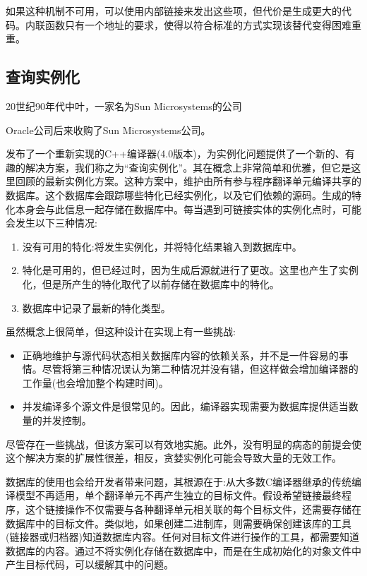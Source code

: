 如果这种机制不可用，可以使用内部链接来发出这些项，但代价是生成更大的代码。内联函数只有一个地址的要求，使得以符合标准的方式实现该替代变得困难重重。

\subsection{查询实例化}

20世纪90年代中叶，一家名为Sun Microsystems的公司

\begin{notice}Oracle公司后来收购了Sun Microsystems公司。
\end{notice}

发布了一个重新实现的C++编译器(4.0版本)，为实例化问题提供了一个新的、有趣的解决方案，我们称之为“查询实例化”。其在概念上非常简单和优雅，但它是这里回顾的最新实例化方案。这种方案中，维护由所有参与程序翻译单元编译共享的数据库。这个数据库会跟踪哪些特化已经实例化，以及它们依赖的源码。生成的特化本身会与此信息一起存储在数据库中。每当遇到可链接实体的实例化点时，可能会发生以下三种情况:

\begin{enumerate}
\item 
没有可用的特化:将发生实例化，并将特化结果输入到数据库中。

\item 
特化是可用的，但已经过时，因为生成后源就进行了更改。这里也产生了实例化，但是所产生的特化取代了以前存储在数据库中的特化。

\item 
数据库中记录了最新的特化类型。
\end{enumerate}

虽然概念上很简单，但这种设计在实现上有一些挑战:

\begin{itemize}
\item 
正确地维护与源代码状态相关数据库内容的依赖关系，并不是一件容易的事情。尽管将第三种情况误认为第二种情况并没有错，但这样做会增加编译器的工作量(也会增加整个构建时间)。

\item 
并发编译多个源文件是很常见的。因此，编译器实现需要为数据库提供适当数量的并发控制。
\end{itemize}

尽管存在一些挑战，但该方案可以有效地实施。此外，没有明显的病态的前提会使这个解决方案的扩展性很差，相反，贪婪实例化可能会导致大量的无效工作。

数据库的使用也会给开发者带来问题，其根源在于:从大多数C编译器继承的传统编译模型不再适用，单个翻译单元不再产生独立的目标文件。假设希望链接最终程序，这个链接操作不仅需要与各种翻译单元相关联的每个目标文件，还需要存储在数据库中的目标文件。类似地，如果创建二进制库，则需要确保创建该库的工具(链接器或归档器)知道数据库内容。任何对目标文件进行操作的工具，都需要知道数据库的内容。通过不将实例化存储在数据库中，而是在生成初始化的对象文件中产生目标代码，可以缓解其中的问题。

